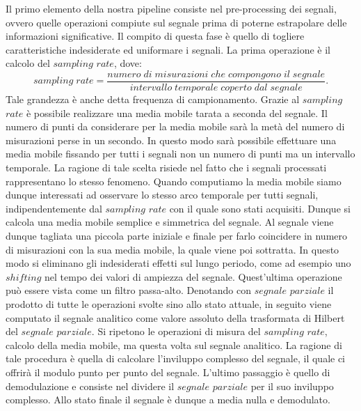 \documentclass[a4paper, 12pt]{book}
\begin{document}
Il primo elemento della nostra pipeline consiste nel pre-processing dei segnali, ovvero quelle operazioni compiute sul segnale prima di poterne estrapolare delle informazioni significative.
Il compito di questa fase è quello di togliere caratteristiche indesiderate ed uniformare i segnali.
La prima operazione è il calcolo del $sampling$ $rate$, dove:
\begin{equation}
	sampling\; rate = \frac{numero\; di\; misurazioni\; che\; compongono\; il\; 				segnale}{intervallo\; temporale\; coperto\; dal\; segnale}.
\end{equation}
Tale grandezza è anche detta frequenza di campionamento.
Grazie al $sampling$ $rate$ è possibile realizzare una media mobile tarata a seconda del segnale.
Il numero di punti da considerare per la media mobile sarà la metà del numero di misurazioni perse in un secondo.
In questo modo sarà possibile effettuare una media mobile fissando per tutti i segnali non un numero di punti ma un intervallo temporale.
La ragione di tale scelta risiede nel fatto che i segnali processati rappresentano lo stesso fenomeno.
Quando computiamo la media mobile siamo dunque interessati ad osservare lo stesso arco temporale per tutti segnali, indipendentemente dal $sampling$ $rate$ con il quale sono stati acquisiti.
Dunque si calcola una media mobile semplice e simmetrica del segnale.
Al segnale viene dunque tagliata una piccola parte iniziale e finale per farlo coincidere in numero di misurazioni con la sua media mobile, la quale viene poi sottratta.
In questo modo si eliminano gli indesiderati effetti sul lungo periodo, come ad esempio uno $shifting$ nel tempo dei valori di ampiezza del segnale.
Quest'ultima operazione può essere vista come un filtro passa-alto.
Denotando con $segnale$ $parziale$ il prodotto di tutte le operazioni svolte sino allo stato attuale, in seguito viene computato il segnale analitico come valore assoluto della trasformata di Hilbert del $segnale$ $parziale$.
Si ripetono le operazioni di misura del $sampling$ $rate$, calcolo della media mobile, ma questa volta sul segnale analitico.
La ragione di tale procedura è quella di calcolare l'inviluppo complesso del segnale, il quale ci offrirà il modulo punto per punto del segnale.
L'ultimo passaggio è quello di demodulazione e consiste nel dividere il $segnale$ $parziale$ per il suo inviluppo complesso.
Allo stato finale il segnale è dunque a media nulla e demodulato.
%
\end{document}
